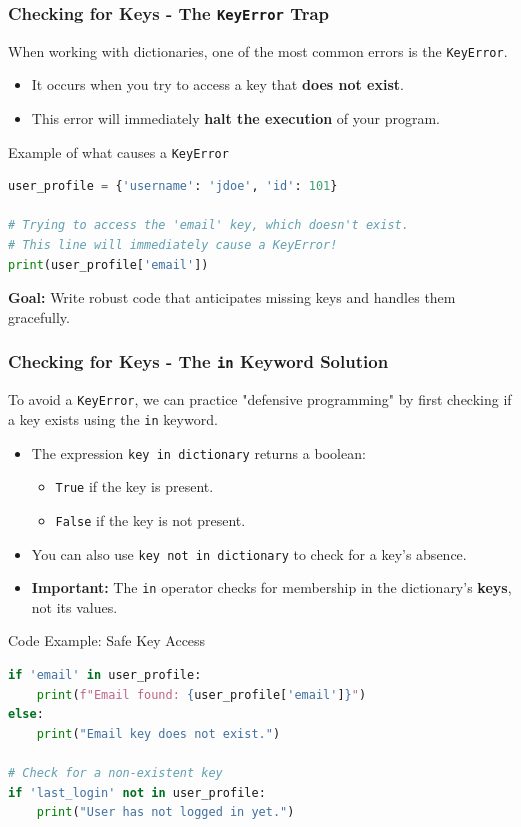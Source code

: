 \documentclass{beamer}
\begin{document}
\begin{frame}[fragile]
    \frametitle{Checking for Keys - The \texttt{KeyError} Trap}

    When working with dictionaries, one of the most common errors is the \texttt{KeyError}.
    \begin{itemize}
        \item It occurs when you try to access a key that \textbf{does not exist}.
        \item This error will immediately \textbf{halt the execution} of your program.
    \end{itemize}

    \begin{block}{Example of what causes a \texttt{KeyError}}
        \begin{lstlisting}[language=Python]
% Define a simple user profile
user_profile = {'username': 'jdoe', 'id': 101}

# Trying to access the 'email' key, which doesn't exist.
# This line will immediately cause a KeyError!
print(user_profile['email'])
        \end{lstlisting}
    \end{block}
    \vspace{1em}
    \textbf{Goal:} Write robust code that anticipates missing keys and handles them gracefully.
\end{frame}

\begin{frame}[fragile]
    \frametitle{Checking for Keys - The \texttt{in} Keyword Solution}
    To avoid a \texttt{KeyError}, we can practice "defensive programming" by first checking if a key exists using the \texttt{in} keyword.

    \begin{itemize}
        \item The expression \texttt{key in dictionary} returns a boolean:
        \begin{itemize}
            \item \texttt{True} if the key is present.
            \item \texttt{False} if the key is not present.
        \end{itemize}
        \item You can also use \texttt{key not in dictionary} to check for a key's absence.
        \item \textbf{Important:} The \texttt{in} operator checks for membership in the dictionary's \textbf{keys}, not its values.
    \end{itemize}

    \begin{block}{Code Example: Safe Key Access}
        \begin{lstlisting}[language=Python]
if 'email' in user_profile:
    print(f"Email found: {user_profile['email']}")
else:
    print("Email key does not exist.")

# Check for a non-existent key
if 'last_login' not in user_profile:
    print("User has not logged in yet.")
        \end{lstlisting}
    \end{block}
\end{frame}
\end{document}
